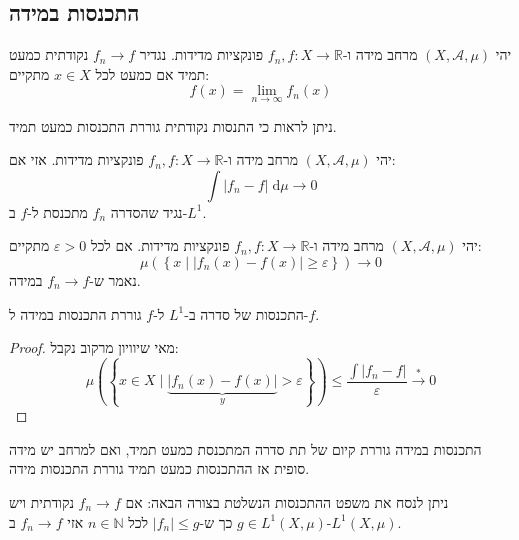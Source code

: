 \documentclass{tstextbook}
\begin{document}
\subsection{התכנסות במידה}

\begin{definition}
יהי \(\left( X,\mathcal{A},\mu \right)\) מרחב מידה ו-\(f_{n},f:X\to \mathbb{R}\) פונקציות מדידות. נגדיר \(f_{n}\to f\) נקודתית כמעט תמיד אם כמעט לכל \(x \in X\) מתקיים:
$$f(x)=\lim_{ n \to \infty } f_{n}(x)$$

\end{definition}
\begin{remark}
ניתן לראות כי התנסות נקודתית גוררת התכנסות כמעט תמיד.

\end{remark}
\begin{definition}[התכנסות ב-\(L^{1}\)]
יהי \(\left( X,\mathcal{A},\mu \right)\) מרחב מידה ו-\(f_{n},f :X\to \mathbb{R}\) פונקציות מדידות. אזי אם:
$$\int \lvert f_{n}-f \rvert  \;\mathrm{d} \mu\to 0 $$
נגיד שהסדרה \(f_{n}\) מתכנסת ל-\(f\) ב-\(L^{1}\).

\end{definition}
\begin{definition}
יהי \(\left( X,\mathcal{A},\mu \right)\) מרחב מידה ו-\(f_{n},f:X\to \mathbb{R}\) פונקציות מדידות. אם לכל \(\varepsilon> 0\) מתקיים:
$$\mu\left( \left\{  x\mid \lvert f_{n}(x)-f(x) \rvert \geq \varepsilon  \right\} \right)\to 0$$
נאמר ש-\(f_{n}\to f\) במידה.

\end{definition}
\begin{corollary}
התכנסות של סדרה ב-\(L^{1}\) ל-\(f\) גוררת התכנסות במידה ל-\(f\).

\end{corollary}
\begin{proof}
מאי שיוויון מרקוב נקבל:
$$\mu\left(\left\{x\in X\mid\underbrace{\left|f_{n}\left(x\right)-f\left(x\right)\right|}_{y}>\varepsilon\right\}\right)\leq\frac{\int\left|f_{n}-f\right|}{\varepsilon}\stackrel{*}{\to}0$$

\end{proof}
\begin{proposition}
התכנסות במידה גוררת קיום של תת סדרה המתכנסת כמעט תמיד, ואם למרחב יש מידה סופית אז ההתכנסות כמעט תמיד גוררת התכנסות מידה.

\end{proposition}
\begin{remark}
ניתן לנסח את משפט ההתכנסות הנשלטת בצורה הבאה:
אם \(f_{n}\to f\) נקודתית ויש \(g \in L^{1}\left( X,\mu \right)\) כך ש-\(\lvert f_{n} \rvert\leq g\) לכל \(n \in \mathbb{N}\) אזי \(f_{n}\to f\) ב-\(L^{1}\left( X,\mu \right)\).

\end{remark}
\end{document}
